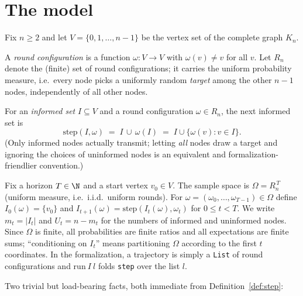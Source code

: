 \section{The model}\label{sec:model}

Fix $n \ge 2$ and let $V = \{0,1,\dots,n-1\}$ be the vertex set of the
complete graph $K_n$.

\begin{definition}\label{def:round}
  \leanok
  A \emph{round configuration} is a function
  $\omega \colon V \to V$ with $\omega(v) \ne v$ for all $v$.
  Let $R_n$ denote the (finite) set of round configurations; it carries the
  uniform probability measure, i.e.\ every node picks a uniformly random
  \emph{target} among the other $n-1$ nodes, independently of all other
  nodes.
\end{definition}

\begin{definition}\label{def:step}
  \leanok
  For an \emph{informed set} $I \subseteq V$ and a round configuration
  $\omega \in R_n$, the next informed set is
  \[
    \mathrm{step}(I,\omega) \;=\; I \,\cup\, \omega(I)
    \;=\; I \cup \{\omega(v) : v \in I\}.
  \]
  (Only informed nodes actually transmit; letting \emph{all} nodes draw a
  target and ignoring the choices of uninformed nodes is an equivalent and
  formalization-friendlier convention.)
\end{definition}

\begin{definition}[Process]\label{def:process}
  \leanok
  Fix a horizon $T \in \N$ and a start vertex $v_0 \in V$. The sample space
  is $\Omega = R_n^{\,T}$ (uniform measure, i.e.\ i.i.d.\ uniform rounds).
  For $\omega = (\omega_0,\dots,\omega_{T-1}) \in \Omega$ define
  $I_0(\omega) = \{v_0\}$ and
  $I_{t+1}(\omega) = \mathrm{step}(I_t(\omega), \omega_t)$ for $0 \le t < T$.
  We write $m_t = |I_t|$ and $U_t = n - m_t$ for the numbers of informed and
  uninformed nodes. Since $\Omega$ is finite, all probabilities are finite
  ratios and all expectations are finite sums; ``conditioning on $I_t$''
  means partitioning $\Omega$ according to the first $t$ coordinates. In the
  formalization, a trajectory is simply a \texttt{List} of round
  configurations and $\mathrm{run}\ I\ l$ folds \texttt{step} over the list
  $l$.
\end{definition}

Two trivial but load-bearing facts, both immediate from
Definition~\ref{def:step}:

